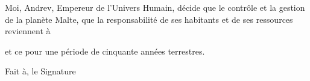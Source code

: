 \documentclass[14pt]{extarticle}
\begin{document}
\begin{framed}
    Moi, Andrev, Empereur de l’Univers Humain, décide que le contrôle et la
    gestion de la planète Malte, que la responsabilité de ses habitants et de
    ses ressources reviennent à

    \vspace{7cm}

    et ce pour une période de cinquante années terrestres.

    \vspace{7cm}

    \noindent
    Fait à\hspace{4cm}, le \hfill Signature

    \vspace{3cm}

\end{framed}
\end{document}
